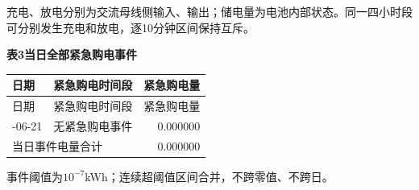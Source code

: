 \noindent 充电、放电分别为交流母线侧输入、输出；储电量为电池内部状态。同一四小时段可分别发生充电和放电，逐10分钟区间保持互斥。
\begin{center}\textbf{表3\quad 当日全部紧急购电事件}\end{center}
\begin{longtable}{llr}\toprule 日期 & 紧急购电时间段 & 紧急购电量\\\midrule\endfirsthead
\toprule 日期 & 紧急购电时间段 & 紧急购电量\\\midrule\endhead
\bottomrule\endfoot
2025-06-21 & 无紧急购电事件 & 0.000000\\
\midrule\multicolumn{2}{l}{当日事件电量合计} & 0.000000\\
\end{longtable}
\noindent 事件阈值为$10^{-7}$kWh；连续超阈值区间合并，不跨零值、不跨日。
\endgroup
\clearpage

